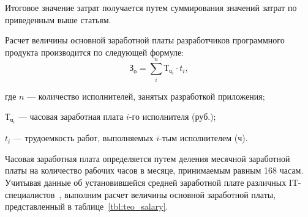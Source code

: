 Итоговое значение затрат получается путем суммирования значений затрат
по приведенным выше статьям.

Расчет величины основной заработной платы разработчиков программного
продукта производится по следующей формуле:
\begin{equation}
  \text{З}_{\text{о}} =
  \sum^n_i \text{Т}_{\text{ч}_{i}} \cdot t_{i},
\end{equation}

\noindent где
\( n \)
--- количество исполнителей, занятых разработкой приложения; \par
\noindent \hspace{6.5mm} \( \text{Т}_{\text{ч}_{i}} \)
--- часовая заработная плата \( i \)-го исполнителя (руб.); \par
\noindent \hspace{6.5mm} \( t_i \)
--- трудоемкость работ, выполняемых \( i \)-тым исполнителем (ч).

Часовая заработная плата определяется путем деления месячной
заработной платы на количество рабочих часов в месяце,
принимаемым равным 168 часам.
Учитывая данные об установившейся средней заработной
плате различных IT-специалистов~\cite{dev_by_salaries},
выполним расчет величины основной заработной платы,
представленный в таблице~\ref{tbl:teo_salary}.

